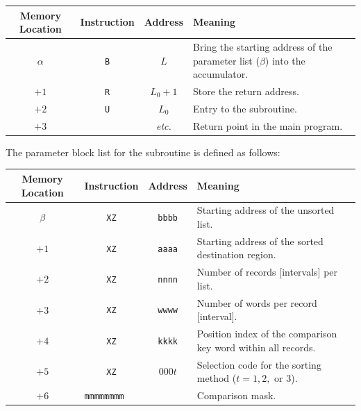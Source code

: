 \begin{table}[h!]
\centering
\begin{tabularx}{\textwidth}{cccX}
\toprule
\textbf{Memory Location} & \textbf{Instruction} & \textbf{Address} & \textbf{Meaning} \\
\midrule
$\alpha$   & \texttt{B} & $L$ & Bring the starting address of the parameter list ($\beta$) into the accumulator. \\
$+1$       & \texttt{R} & $L_0 + 1$ & Store the return address. \\
$+2$       & \texttt{U} & $L_0$ & Entry to the subroutine. \\
$+3$       &            & \textit{etc.} & Return point in the main program. \\
\bottomrule
\end{tabularx}
\end{table}

\noindent The parameter block list for the subroutine is defined as follows:

\begin{table}[h!]
\centering
\begin{tabularx}{\textwidth}{cccX}
\toprule
\textbf{Memory Location} & \textbf{Instruction} & \textbf{Address} & \textbf{Meaning} \\
\midrule
$\beta$ & \texttt{XZ} & \texttt{bbbb} & Starting address of the unsorted list. \\
$+1$    & \texttt{XZ} & \texttt{aaaa} & Starting address of the sorted destination region. \\
$+2$    & \texttt{XZ} & \texttt{nnnn} & Number of records [intervals] per list. \\
$+3$    & \texttt{XZ} & \texttt{wwww} & Number of words per record [interval]. \\
$+4$    & \texttt{XZ} & \texttt{kkkk} & Position index of the comparison key word within all records. \\
$+5$    & \texttt{XZ} & $000t$        & Selection code for the sorting method ($t = 1, 2,$ or $3$). \\
$+6$    & \multicolumn{2}{l}{\texttt{mmmmmmmm}} & Comparison mask. \\
\bottomrule
\end{tabularx}
\end{table}

